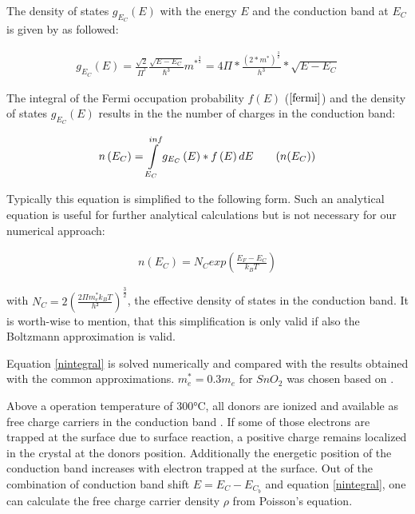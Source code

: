 \documentclass[11pt]{article}
\begin{document}
The density of states \(g_{E_{C}}\left(E\right)\) with the energy \(E\)
and the conduction band at \(E_{C}\) is given by \cite{Sze2007} as
followed:

\begin{align}
g_{E_{C}}\left(E\right)=\frac{\sqrt{2}}{\Pi^{^{2}}}\frac{\sqrt{E-E_{C}}}{\hbar^{3}}m^{*^{\frac{3}{2}}}=4\Pi*\frac{\left(2*m^{*}\right)^{\frac{3}{2}}}{h^{3}}*\sqrt{E-E_{C}}
\end{align}

The integral of the Fermi occupation probability \(f(E)\)
(\(\ref{fermi}\)) and the density of states \(g_{E_{C}}\left(E\right)\)
results in the the number of charges in the conduction band:

\begin{align}
n\left(E_{C}\right)=\intop_{E_{C}}^{inf}g_{E_{C}}\left(E\right)*f\left(E\right)dE\label{nintegral}\tag{$n(E_C)$}
\end{align}

Typically this equation is simplified to the following form. Such an
analytical equation is useful for further analytical calculations but is
not necessary for our numerical approach:

\begin{align}
n(E_{C})=N_{C}exp\left(\frac{E_{F}-E_{C}}{k_{B}T}\right)
\end{align}

with
\(N_{C}=2\left(\frac{2\Pi m_{e}^{*}k_{B}T}{h²}\right)^{\frac{3}{2}}\),
the effective density of states in the conduction band. It is worth-wise
to mention, that this simplification is only valid if also the Boltzmann
approximation is valid.

Equation \ref{nintegral} is solved numerically and compared with the
results obtained with the common approximations. \(m_{e}^{*}=0.3m_{e}\)
for \(SnO_{2}\) was chosen based on \cite{Batzill2005}.

Above a operation temperature of 300°C, all donors are ionized and
available as free charge carriers in the conduction band
\cite{Barsan2015}. If some of those electrons are trapped at the surface
due to surface reaction, a positive charge remains localized in the
crystal at the donors position. Additionally the energetic position of
the conduction band increases with electron trapped at the surface. Out
of the combination of conduction band shift \(E=E_{C}-E_{C_{b}}\) and
equation \ref{nintegral}, one can calculate the free charge carrier
density \(\rho\) from Poisson's equation.
\end{document}
